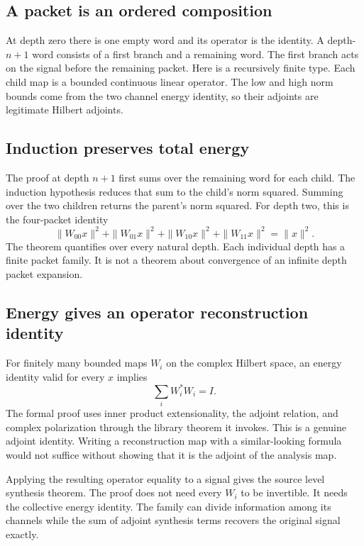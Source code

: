 \subsection{A packet is an ordered composition}
At depth zero there is one empty word and its operator is the identity. A depth-$n+1$ word consists of a first branch and a remaining word. The first branch acts on the signal before the remaining packet.
Here  is a recursively finite type. Each child map is a bounded continuous linear operator. The low and high norm bounds come from the two channel energy identity, so their adjoints are legitimate Hilbert adjoints.

\subsection{Induction preserves total energy}
The proof at depth $n+1$ first sums over the remaining word for each child. The induction hypothesis reduces that sum to the child's norm squared. Summing over the two children returns the parent's norm squared.
For depth two, this is the four-packet identity
\[
\|W_{00}x\|^2+\|W_{01}x\|^2+\|W_{10}x\|^2+\|W_{11}x\|^2=\|x\|^2.
\]
The theorem quantifies over every natural depth. Each individual depth has a finite packet family. It is not a theorem about convergence of an infinite depth packet expansion.

\subsection{Energy gives an operator reconstruction identity}
For finitely many bounded maps $W_i$ on the complex Hilbert space, an energy identity valid for every $x$ implies
\[
\sum_i W_i^*W_i=I.
\]
The formal proof uses inner product extensionality, the adjoint relation, and complex polarization through the library theorem it invokes.
This is a genuine adjoint identity. Writing a reconstruction map with a similar-looking formula would not suffice without showing that it is the adjoint of the analysis map.

Applying the resulting operator equality to a signal gives the source level synthesis theorem.
The proof does not need every $W_i$ to be invertible. It needs the collective energy identity. The family can divide information among its channels while the sum of adjoint synthesis terms recovers the original signal exactly.
